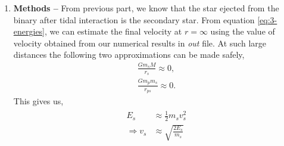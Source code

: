 \documentclass[a4paper]{article}
\begin{document}
\begin{enumerate} [label*=\textbf{(\alph*)}]
					The total energy of the binary, which is the sum of the energies of the two stars is conserved over time and is zero. After time \(t=0\), when the binary reaches the periastron, the energy of primary star becomes extremely negative, while the energy of the secondary star becomes extremely positive. This indicates that orbit of primary star become more bound to the black hole and vice versa. This suggests more strongly that deviations in orbits of stars of the binary are essentially due to gravitational interactions between binary and black hole, in case the point of approach is closer than some limiting value, decided by the value of \(D\). 
					
				\item
					\subitem \textbf{Methods --}
					From previous part, we know that the star ejected from the binary after tidal interaction is the secondary star. From equation \ref{eq:3-energies}, we can estimate the final velocity at \(r=\infty\) using the value of velocity obtained from our numerical results in \emph{out} file. At such large distances the following two approximations can be made safely,
					\begin{equation}
						\begin{gathered}
							\frac{G m_s M}{r_s} \approx 0, \\
							\frac{G m_p m_s}{r_{ps}} \approx 0 .
						\end{gathered}
					\end{equation}
					This gives us,
					\begin{equation}
						\begin{gathered}
							\begin{aligned}
								E_s &\approx \frac{1}{2} m_s v_s^2 \\
								\Rightarrow v_s &\approx \sqrt{\frac{2 E_s}{m_s}}
							\end{aligned}
						\end{gathered}
						\label{eq:3-secondary_velocity_infty}
					\end{equation}
				

\end{enumerate}
\end{document}
